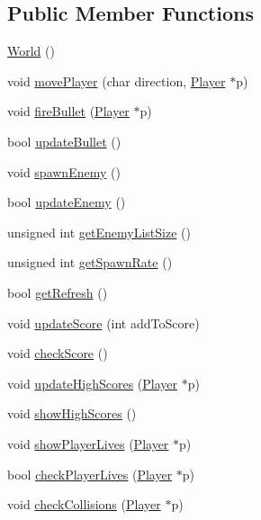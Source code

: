 \subsection*{Public Member Functions}
\begin{DoxyCompactItemize}
\item 
\hyperlink{class_world_afa39d4e6f714a7a3691ac0c656f5e8a8}{World} ()
\item 
void \hyperlink{class_world_ad76a5c30fcb5d5bbdf0fa7d841b7fb28}{move\-Player} (char direction, \hyperlink{class_player}{Player} $\ast$p)
\item 
void \hyperlink{class_world_a5fc3eeeccb6be52aed487e60fd482bd4}{fire\-Bullet} (\hyperlink{class_player}{Player} $\ast$p)
\item 
bool \hyperlink{class_world_a4c1cbe120ce27ad9e07699805d2d1c2a}{update\-Bullet} ()
\item 
void \hyperlink{class_world_a272362ddd8e710fc99837a5bb7e75c92}{spawn\-Enemy} ()
\item 
bool \hyperlink{class_world_a2fc9351f4b946d4298c6e0dd8337202f}{update\-Enemy} ()
\item 
unsigned int \hyperlink{class_world_acb0800fa65e5a982f79be1caaff4c959}{get\-Enemy\-List\-Size} ()
\item 
unsigned int \hyperlink{class_world_a413a2e1f7353dadff0cec27e92c6a9fe}{get\-Spawn\-Rate} ()
\item 
bool \hyperlink{class_world_a086144235159c3747b099d57d2eff24a}{get\-Refresh} ()
\item 
void \hyperlink{class_world_a4c6b92ca6d00f977710c458ece504aef}{update\-Score} (int add\-To\-Score)
\item 
void \hyperlink{class_world_a9e7ce8f6ae1fff3640cc99cf2f19d54a}{check\-Score} ()
\item 
void \hyperlink{class_world_a6438283b3088d3afe058df7566e7b8e8}{update\-High\-Scores} (\hyperlink{class_player}{Player} $\ast$p)
\item 
void \hyperlink{class_world_af29bd7e1630114caf6f99b2bcd37a647}{show\-High\-Scores} ()
\item 
void \hyperlink{class_world_af75a7049215d511aa08cd568983099e0}{show\-Player\-Lives} (\hyperlink{class_player}{Player} $\ast$p)
\item 
bool \hyperlink{class_world_a1a93b6985e00fc5eb7c417f703332532}{check\-Player\-Lives} (\hyperlink{class_player}{Player} $\ast$p)
\item 
void \hyperlink{class_world_a5ca54d764c1e0305b3110ebffd19fc4d}{check\-Collisions} (\hyperlink{class_player}{Player} $\ast$p)

\end{DoxyCompactItemize}
